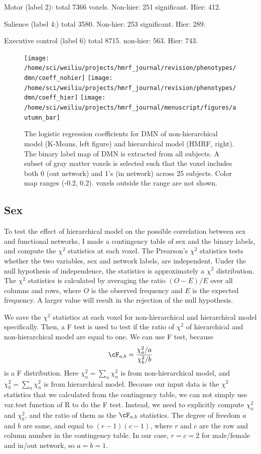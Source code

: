 \documentclass[12pt]{article}
\begin{document}
Motor (label 2): total 7366 voxels. Non-hier: 251 significant. Hier: 412.

Salience (label 4:) total 3580. Non-hier: 253 significant. Hier: 289. 

Executive control (label 6) total 8715.  non-hier: 563. Hier: 743. 

\begin{figure}[htb]
  \centering
  \texttt{[image: /home/sci/weiliu/projects/hmrf\_journal/revision/phenotypes/dmn/coeff\_nohier]}
  \texttt{[image: /home/sci/weiliu/projects/hmrf\_journal/revision/phenotypes/dmn/coeff\_hier]}
  \texttt{[image: /home/sci/weiliu/projects/hmrf\_journal/menuscript/figures/autumn\_bar]}
  \caption{The logistic regression coefficients for DMN of non-hierarchical
    model (K-Means, left figure) and hierarchical model (HMRF, right). The
    binary label map of DMN is extracted from all subjects. A subset of gray
    matter voxels is selected such that the voxel includes both 0 (out network)
    and 1's (in network) across 25 subjects. Color map ranges (-0.2,
    0.2). voxels outside the range are not shown. }
\end{figure}


\subsection{Sex}
To test the effect of hierarchical model on the possible correlation between sex
and functional networks, I made a contingency table of sex and the binary
labels, and compute the $\chi^2$ statistics at each voxel. The Prearson's
$\chi^2$ statistics tests whether the two variables, sex and network labels, are
independent. Under the null hypothesis of independence, the statistics is
approximately a $\chi^2$ distribution. The $\chi^2$ statistics is calculated by
averaging the ratio $ (O - E) / E $ over all columns and rows, where $O$ is the
observed frequency and $E$ is the expected frequency. A larger value will result
in the rejection of the null hypothesis. 

We save the $\chi^2$ statistics at each voxel for non-hierarchical and
hierarchical model specifically. Then, a F test is used to test if the ratio of
$\chi^2$ of hierarchical and non-hierarchical model are equal to one. We can use
F test, because
\[
\cF_{a, b} = \frac{\chi_a^2 / a}{\chi_b^2 / b}
\]
is a F distribution. Here $\chi_a^2 = \sum_n \chi_n^2$ is from non-hierarchical
model, and $\chi_b^2 = \sum_n \chi_n^2$ is from hierarchical model. Because our
input data is the $\chi^2$ statistics that we calculated from the contingency
table, we can not simply use \textsf{var.test} function of R to do the F
test. Instead, we need to explicitly compute $\chi_a^2$ and $\chi_b^2$, and the
ratio of them as the $\cF_{a,b}$ statistics. The degree of freedom $a$ and $b$
are same, and equal to $(r-1)(c-1)$, where $r$ and $c$ are the row and column
number in the contingency table. In our case, $r = c = 2$ for male/female and
in/out network, so $a = b = 1$.
\end{document}
